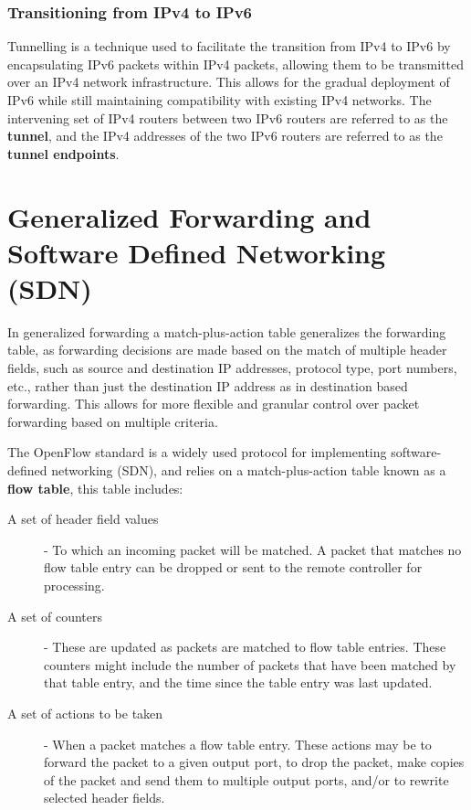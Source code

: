 \documentclass[12pt letter]{report}
\begin{document}
\subsection{Transitioning from IPv4 to IPv6}

Tunnelling is a technique used to facilitate the transition from IPv4
to IPv6 by encapsulating IPv6 packets within IPv4 packets, allowing
them to be transmitted over an IPv4 network infrastructure. This
allows for the gradual deployment of IPv6 while still maintaining
compatibility with existing IPv4 networks. The intervening set of
IPv4 routers between two IPv6 routers are referred to as the
\textbf{tunnel}, and the IPv4 addresses of the two IPv6 routers are
referred to as the \textbf{tunnel endpoints}.

\chapter{Generalized Forwarding and Software Defined Networking (SDN)}

In generalized forwarding a match-plus-action table generalizes the
forwarding table, as forwarding decisions are made based on the
match of multiple header fields, such as source and destination IP
addresses, protocol type, port numbers, etc., rather than just the
destination IP address as in destination based forwarding. This
allows for more flexible and granular control over packet forwarding
based on multiple criteria.

The OpenFlow standard is a widely used protocol for implementing
software-defined networking (SDN), and relies on a match-plus-action
table known as a \textbf{flow table}, this table includes:
\begin{description}
  \item[A set of header field values] - To which an incoming packet
    will be matched. A packet that matches no flow table entry can be
    dropped or sent to the remote controller for processing.
  \item[A set of counters] - These are updated as packets are matched
    to flow table entries. These counters might include the number of
    packets that have been matched by that table entry, and the time
    since the table entry was last updated.
  \item[A set of actions to be taken] - When a packet matches a flow
    table entry. These actions may be to forward the packet to a
    given output port, to drop the packet, make copies of the packet
    and send them to multiple output ports, and/or to rewrite
    selected header fields.
\end{description}
\end{document}
